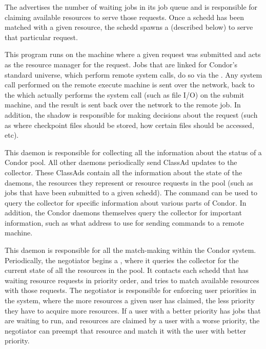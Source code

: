 \begin{description}
The  advertises the number of waiting jobs in its job queue and
is responsible for claiming available resources to serve those
requests.  Once a schedd has been matched with a given resource, the
schedd spawns a  (described below) to serve that
particular request.

\item[\Condor{shadow}] This program
runs on the machine where a given
request was submitted and acts as the resource manager for the
request.  Jobs that are linked for Condor's standard universe, which
perform remote system calls, do so via the .  Any
system call performed on the remote execute machine is sent over the
network, back to the  which actually performs the
system call (such as file I/O) on the submit machine, and the result
is sent back over the network to the remote job.  In addition, the
shadow is responsible for making decisions about the request (such as
where checkpoint files should be stored, how certain files should be
accessed, etc).  

\item[\Condor{collector}] This daemon
is responsible for collecting
all the information about the status of a Condor pool.  All other
daemons periodically send ClassAd updates to
the collector.  These ClassAds contain all the information about the
state of the daemons, the resources they represent or resource
requests in the pool (such as jobs that have been submitted to a given
schedd).  The  command can be used to query the
collector for specific information about various parts of Condor.  In
addition, the Condor daemons themselves query the collector for
important information, such as what address to use for sending
commands to a remote machine. 

\item[\Condor{negotiator}] This daemon
is responsible for all the
match-making within the Condor system.  Periodically, the negotiator
begins a , where it queries the collector for
the current state of all the resources in the pool.  It contacts each
schedd that has waiting resource requests in priority order, and tries
to match available resources with those requests.  The negotiator is
responsible for enforcing user priorities in the system, where the
more resources a given user has claimed, the less priority they have
to acquire more resources.  If a user with a better priority has jobs
that are waiting to run, and resources are claimed by a user with a
worse priority, the negotiator can preempt that resource and match it
with the user with better priority.


\end{description}
